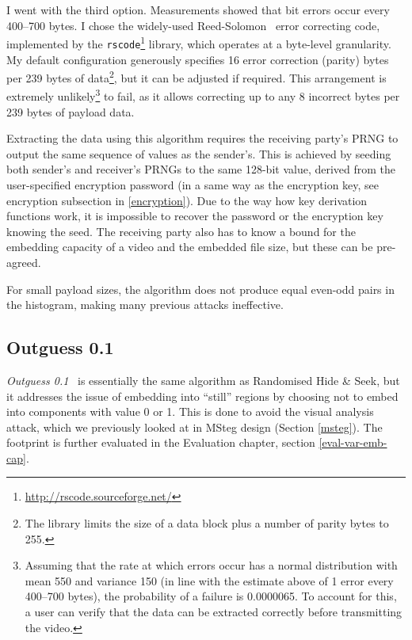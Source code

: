 \documentclass[12pt,british,twoside,notitlepage,usenames,dvipsnames,hypens,final]{report}
\numberwithin{equation}{section}
\numberwithin{figure}{section}
\begin{document}
I went with the third option. Measurements showed that bit errors occur every 400--700 bytes. I chose the widely-used Reed-Solomon~\cite{clarke2002reed} error correcting code, implemented by the \texttt{rscode}\footnote{\url{http://rscode.sourceforge.net/}} library, which operates at a byte-level granularity. My default configuration generously specifies 16 error correction (parity) bytes per 239 bytes of data\footnote{The library limits the size of a data block plus a number of parity bytes to 255.}, but it can be adjusted if required. This arrangement is extremely unlikely\footnote{Assuming that the rate at which errors occur has a normal distribution with mean 550 and variance 150 (in line with the estimate above of 1 error every 400--700 bytes), the probability of a failure is 0.0000065. To account for this, a user can verify that the data can be extracted correctly before transmitting the video.} to fail, as it allows correcting up to any 8 incorrect bytes per 239 bytes of payload data.

Extracting the data using this algorithm requires the receiving party's PRNG to output the same sequence of values as the sender's. This is achieved by seeding both sender's and receiver's PRNGs to the same 128-bit value, derived from the user-specified encryption password (in a same way as the encryption key, see encryption subsection in \ref{encryption}). Due to the way how key derivation functions work, it is impossible to recover the password or the encryption key knowing the seed. The receiving party also has to know a bound for the embedding capacity of a video and the embedded file size, but these can be pre-agreed.

For small payload sizes, the algorithm does not produce equal even-odd pairs in the histogram, making many previous attacks ineffective.

\subsection{Outguess 0.1}
\label{outguess1}

\emph{Outguess 0.1}~\cite{bateman} is essentially the same algorithm as Randomised Hide \& Seek, but it addresses the issue of embedding into ``still'' regions by choosing not to embed into components with value 0 or 1. This is done to avoid the visual analysis attack, which we previously looked at in MSteg design (Section \ref{msteg}). The footprint is further evaluated in the Evaluation chapter, section \ref{eval-var-emb-cap}.
\end{document}
